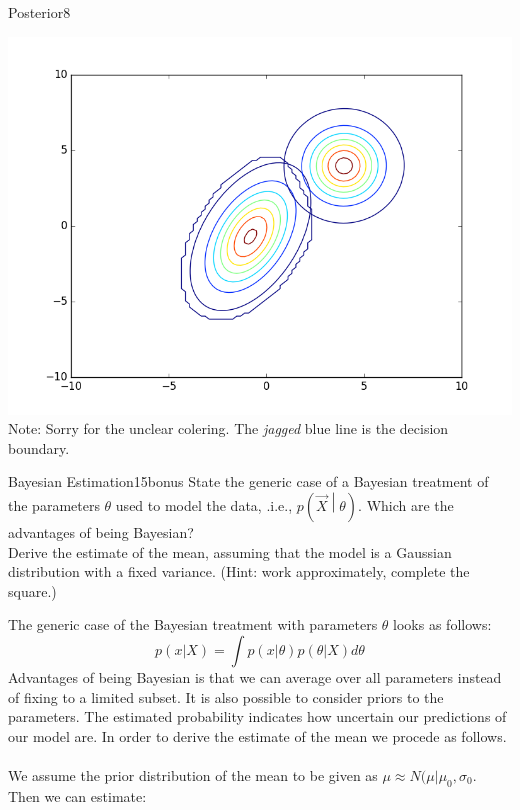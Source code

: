 \begin{questions}
\begin{question}{Posterior}{8}
\begin{answer}
\centering \includegraphics[width=1.0\linewidth]{dataSets/2-2-e}\label{fig:decisionboundary} \\
Note: Sorry for the unclear colering. The \emph{jagged} blue line is the decision boundary.
\end{answer}

\end{question}


\begin{question}{Bayesian Estimation}{15}{bonus}
State the generic case of a Bayesian treatment of the parameters $\theta$ used to model the data, .i.e., $p(\vec X \middle | \theta )$. 
Which are the advantages of being Bayesian? 
\\ Derive the estimate of the mean, assuming that the model is a Gaussian distribution with a fixed variance. (Hint: work approximately, complete the square.)


\begin{answer}
The generic case of the Bayesian treatment with parameters $\theta$ looks as follows:
\[
	p(x|X)=\int p(x|\theta )p(\theta | X)d\theta
\]
Advantages of being Bayesian is that we can average over all parameters instead of fixing to a limited subset. It is also possible to consider priors to the parameters. The estimated probability indicates how uncertain our predictions of our model are. In order to derive the estimate of the mean we procede as follows. \\
\\
We assume the prior distribution of the mean to be given as $\mu \approx N(\mu |\mu_0, \sigma_0$. Then we can estimate:


\end{answer}
\end{question}
\end{questions}
